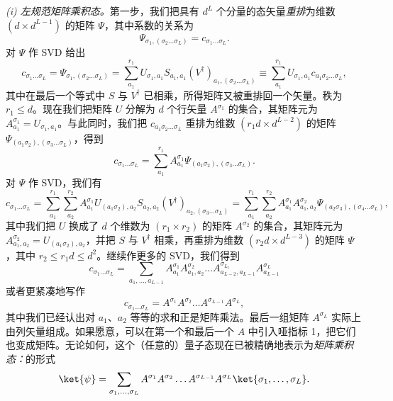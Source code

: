 {\em (i) 左规范矩阵乘积态。}第一步，我们把具有 $d^L$ 个分量的态矢量{\em 重排}为维数 $(d \times d^{L-1})$ 的矩阵 $\Psi$，其中系数的关系为 
\begin{equation}
\Psi_{\sigma_1, (\sigma_2 \ldots \sigma_L)} = c_{\sigma_1 \ldots \sigma_L}  .
\end{equation}
对 $\Psi$ 作 SVD 给出
\begin{equation}
c_{\sigma_1 \ldots \sigma_L}  = \Psi_{\sigma_1, (\sigma_2 \ldots \sigma_L)} = \sum_{a_1}^{r_1} U_{\sigma_1,a_1} S_{a_1,a_1} (V^\dagger)_{a_1, (\sigma_2 \ldots \sigma_L)} \equiv \sum_{a_1}^{r_1}  U_{\sigma_1,a_1} c_{a_1\sigma_2\ldots\sigma_L} ,
\end{equation}
其中在最后一个等式中 $S$ 与 $V^\dagger$ 已相乘，所得矩阵又被重排回一个矢量。秩为 $r_1 \leq d$。现在我们把矩阵 $U$ 分解为 $d$ 个行矢量 $A^{\sigma_1}$ 的集合，其矩阵元为 $A^{\sigma_1}_{a_1}=U_{\sigma_1,a_1}$。与此同时，我们把 $c_{a_1\sigma_2\ldots\sigma_L}$ 重排为维数 $(r_1 d \times d^{L-2})$ 的矩阵 $\Psi_{(a_1\sigma_2),(\sigma_3 \ldots \sigma_L)}$，得到
\begin{equation}
c_{\sigma_1 \ldots \sigma_L}  = \sum_{a_1}^{r_1} A^{\sigma_1}_{a_1} \Psi_{(a_1\sigma_2), (\sigma_3 \ldots \sigma_L)} .
\end{equation}
对 $\Psi$ 作 SVD，我们有 
\begin{equation}
c_{\sigma_1 \ldots \sigma_L}  = \sum_{a_1}^{r_1} \sum_{a_2}^{r_2} A^{\sigma_1}_{a_1} U_{(a_1\sigma_2),a_2} S_{a_2,a_2} (V^\dagger)_{a_2, (\sigma_3 \ldots \sigma_L)} =  
\sum_{a_1}^{r_1} \sum_{a_2}^{r_2} A^{\sigma_1}_{a_1} A^{\sigma_2}_{a_1,a_2} \Psi_{(a_2\sigma_3), (\sigma_4 \ldots \sigma_L)} ,
\end{equation}
其中我们把 $U$ 换成了 $d$ 个维数为 $(r_1 \times r_2)$ 的矩阵 $A^{\sigma_2}$ 的集合，其矩阵元为 $A^{\sigma_2}_{a_1,a_2} = U_{(a_1\sigma_2),a_2}$，并把 $S$ 与 $V^\dagger$ 相乘，再重排为维数 $(r_2 d \times d ^{L-3})$ 的矩阵 $\Psi$，其中 $r_2 \leq r_1 d \leq d^2$。继续作更多的 SVD，我们得到
\begin{equation}
c_{\sigma_1 \ldots \sigma_L} = \sum_{a_1, \ldots, a_{L-1}} A^{\sigma_1}_{a_1} A^{\sigma_2}_{a_1,a_2} \ldots A^{\sigma_{L_1}}_{a_{L-2},a_{L-1}} A^{\sigma_{L}}_{a_{L-1}}
\end{equation}
或者更紧凑地写作
\begin{equation}
c_{\sigma_1 \ldots \sigma_L} = A^{\sigma_1} A^{\sigma_2} \ldots A^{\sigma_{L-1}} A^{\sigma_L} ,
\end{equation}
其中我们已经认出对 $a_1$、$a_2$ 等等的求和正是矩阵乘法。最后一组矩阵 $A^{\sigma_L}$ 实际上由列矢量组成。如果愿意，可以在第一个和最后一个 $A$ 中引入哑指标 1，把它们也变成矩阵。无论如何，这个（任意的）量子态现在已被精确地表示为{\em 矩阵乘积态：}的形式
\begin{equation}
\ket{\psi} = \sum_{\sigma_1,\ldots,\sigma_L} A^{\sigma_1} A^{\sigma_2} \ldots A^{\sigma_{L-1}} A^{\sigma_L} \ket{\sigma_1,\ldots,\sigma_L} .
\end{equation}

